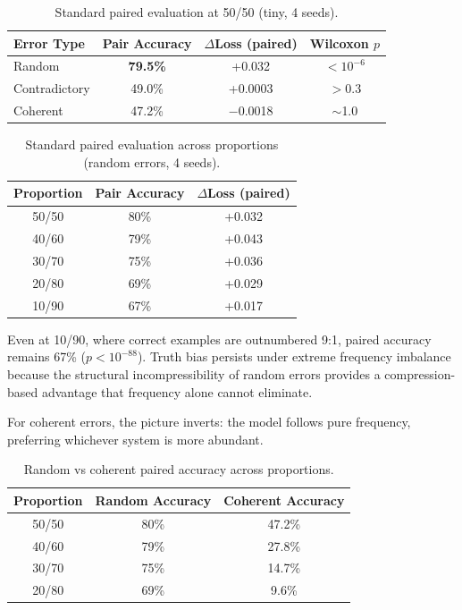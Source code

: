 \documentclass[10pt]{article} %
\begin{document}
\begin{table}[t]
\caption{Standard paired evaluation at 50/50 (tiny, 4 seeds).}
\label{tab:std_baselines}
\centering
\begin{tabular}{lccc}
\toprule
Error Type & Pair Accuracy & $\Delta$Loss (paired) & Wilcoxon $p$ \\
\midrule
Random & \textbf{79.5\%} & +0.032 & $< 10^{-6}$ \\
Contradictory & 49.0\% & +0.0003 & $> 0.3$ \\
Coherent & 47.2\% & $-$0.0018 & ${\sim}$1.0 \\
\bottomrule
\end{tabular}
\end{table}

\begin{table}[t]
\caption{Standard paired evaluation across proportions (random errors, 4 seeds).}
\label{tab:rand_prop}
\centering
\begin{tabular}{ccc}
\toprule
Proportion & Pair Accuracy & $\Delta$Loss (paired) \\
\midrule
50/50 & 80\% & +0.032 \\
40/60 & 79\% & +0.043 \\
30/70 & 75\% & +0.036 \\
20/80 & 69\% & +0.029 \\
10/90 & 67\% & +0.017 \\
\bottomrule
\end{tabular}
\end{table}

Even at 10/90, where correct examples are outnumbered 9:1, paired accuracy remains 67\% ($p < 10^{-88}$). Truth bias persists under extreme frequency imbalance because the structural incompressibility of random errors provides a compression-based advantage that frequency alone cannot eliminate.

For coherent errors, the picture inverts: the model follows pure frequency, preferring whichever system is more abundant.

\begin{table}[t]
\caption{Random vs coherent paired accuracy across proportions.}
\label{tab:coh_prop}
\centering
\begin{tabular}{ccc}
\toprule
Proportion & Random Accuracy & Coherent Accuracy \\
\midrule
50/50 & 80\% & 47.2\% \\
40/60 & 79\% & 27.8\% \\
30/70 & 75\% & 14.7\% \\
20/80 & 69\% & 9.6\% \\
\bottomrule
\end{tabular}
\end{table}
\end{document}
